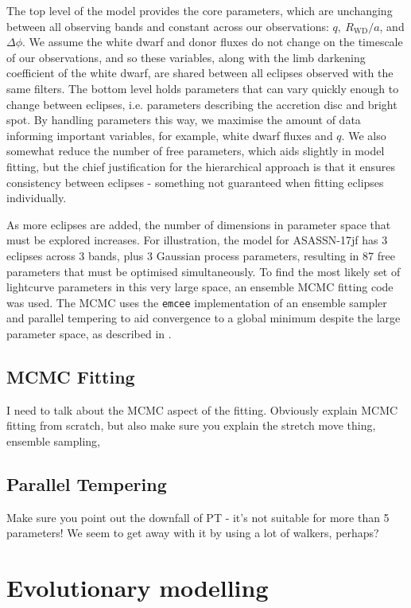 The top level of the model provides the core parameters, which are unchanging between all observing bands and constant across our observations: $q,\ R_\mathrm{WD}/a$, and $\Delta\phi$. We assume the white dwarf and donor fluxes do not change on the timescale of our observations, and so these variables, along with the limb darkening coefficient of the white dwarf, are shared between all eclipses observed with the same filters. The bottom level holds parameters that can vary quickly enough to change between eclipses, i.e. parameters describing the accretion disc and bright spot. By handling parameters this way, we maximise the amount of data informing important variables, for example, white dwarf fluxes and $q$. We also somewhat reduce the number of free parameters, which aids slightly in model fitting, but the chief justification for the hierarchical approach is that it ensures consistency between eclipses - something not guaranteed when fitting eclipses individually.

As more eclipses are added, the number of dimensions in parameter space that must be explored increases. For illustration, the model for ASASSN-17jf has 3 eclipses across 3 bands, plus 3 Gaussian process parameters, resulting in 87 free parameters that must be optimised simultaneously. To find the most likely set of lightcurve parameters in this very large space, an ensemble MCMC fitting code was used. The MCMC uses the \texttt{emcee} implementation of an ensemble sampler and parallel tempering \citep{foreman2012} to aid convergence to a global minimum despite the large parameter space, as described in \citet{McAllister2019}.




\subsection{MCMC Fitting}
I need to talk about the MCMC aspect of the fitting. Obviously explain MCMC fitting from scratch, but also make sure you explain the stretch move thing, ensemble sampling, 

\subsection{Parallel Tempering}
Make sure you point out the downfall of PT - it's not suitable for more than 5 parameters! We seem to get away with it by using a lot of walkers, perhaps?


\section{Evolutionary modelling}
\label{sect:method:evolutionary modelling}